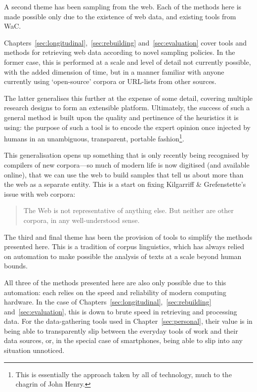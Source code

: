A second theme has been sampling from the web.  Each of the methods here is made possible only due to the existence of web data, and existing tools from WaC.

Chapters~\ref{sec:longitudinal},~\ref{sec:rebuilding} and~\ref{sec:evaluation} cover tools and methods for retrieving web data according to novel sampling policies.  In the former case, this is performed at a scale and level of detail not currently possible, with the added dimension of time, but in a manner familiar with anyone currently using `open-source' corpora or URL-lists from other sources.

The latter generalises this further at the expense of some detail, covering multiple research designs to form an extensible platform.  Ultimately, the success of such a general method is built upon the quality and pertinence of the heuristics it is using: the purpose of such a tool is to encode the expert opinion once injected by humans in an unambiguous, transparent, portable fashion\footnote{This is essentially the approach taken by all of technology, much to the chagrin of John Henry.}.

This generalisation opens up something that is only recently being recognised by compilers of new corpora---so much of modern life is now digitised (and available online), that we can use the web to build samples that tell us about more than the web as a separate entity.  This is a start on fixing Kilgarriff \& Grefenstette's issue with web corpora\cite[p. 343]{kilgarriff2003introduction}:

\begin{quote}
The Web is not representative of anything else. But neither are other corpora, in any well-understood sense.
\end{quote}


The third and final theme has been the provision of tools to simplify the methods presented here.  This is a tradition of corpus linguistics, which has always relied on automation to make possible the analysis of texts at a scale beyond human bounds.

All three of the methods presented here are also only possible due to this automation: each relies on the speed and reliability of modern computing hardware.  In the case of Chapters~\ref{sec:longitudinal},~\ref{sec:rebuilding} and~\ref{sec:evaluation}, this is down to brute speed in retrieving and processing data.  For the data-gathering tools used in Chapter~\ref{sec:personal}, their value is in being able to transparently slip between the everyday tools of work and their data sources, or, in the special case of smartphones, being able to slip into any situation unnoticed.

